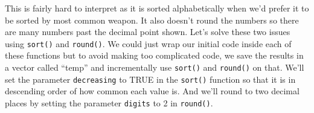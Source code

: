 \documentclass[
]{krantz}
\makeatletter
\newenvironment{Shaded}{\begin{snugshade}}{\end{snugshade}}
\newcommand{\AttributeTok}[1]{\textcolor[rgb]{0.61,0.61,0.61}{#1}}
\newcommand{\CommentTok}[1]{\textcolor[rgb]{0.37,0.37,0.37}{\textit{#1}}}
\newcommand{\ConstantTok}[1]{\textcolor[rgb]{0,0,0}{#1}}
\newcommand{\DecValTok}[1]{\textcolor[rgb]{0.06,0.06,0.06}{#1}}
\newcommand{\FunctionTok}[1]{\textcolor[rgb]{0,0,0}{#1}}
\newcommand{\NormalTok}[1]{#1}
\newcommand{\OtherTok}[1]{\textcolor[rgb]{0.37,0.37,0.37}{#1}}
\newcommand{\SpecialCharTok}[1]{\textcolor[rgb]{0,0,0}{#1}}
\newenvironment{kframe}{%
\medskip{}
\setlength{\fboxsep}{.8em}
 \def\at@end@of@kframe{}%
 \ifinner\ifhmode%
  \def\at@end@of@kframe{\end{minipage}}%
  \begin{minipage}{\columnwidth}%
 \fi\fi%
 \def\FrameCommand##1{\hskip\@totalleftmargin \hskip-\fboxsep
 \colorbox{shadecolor}{##1}\hskip-\fboxsep
     \hskip-\linewidth \hskip-\@totalleftmargin \hskip\columnwidth}%
 \MakeFramed {\advance\hsize-\width
   \@totalleftmargin\z@ \linewidth\hsize
   \@setminipage}}%
 {\par\unskip\endMakeFramed%
 \at@end@of@kframe}
\renewenvironment{Shaded}{\begin{kframe}}{\end{kframe}}
\makeatother
\begin{document}
This is fairly hard to interpret as it is sorted
alphabetically when we'd prefer it to be sorted by most
common weapon. It also doesn't round the numbers so there
are many numbers past the decimal point shown. Let's solve
these two issues using \texttt{sort()} and \texttt{round()}.
We could just wrap our initial code inside each of these
functions but to avoid making too complicated code, we save
the results in a vector called ``temp'' and incrementally
use \texttt{sort()} and \texttt{round()} on that. We'll set
the parameter \texttt{decreasing} to TRUE in the
\texttt{sort()} function so that it is in descending order
of how common each value is. And we'll round to two decimal
places by setting the parameter \texttt{digits} to 2 in
\texttt{round()}.

\begin{Shaded}
\end{Shaded}
\end{document}
